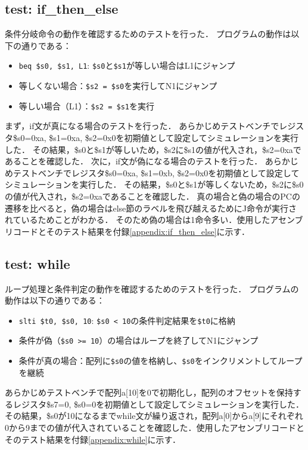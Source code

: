 \documentclass[dvipdfmx]{jsarticle}
\begin{document}
\subsection{test: if\_then\_else}
条件分岐命令の動作を確認するためのテストを行った．
プログラムの動作は以下の通りである：
\begin{itemize}
\item \texttt{beq \$s0, \$s1, L1}: \texttt{\$s0}と\texttt{\$s1}が等しい場合はL1にジャンプ
\item 等しくない場合：\texttt{\$s2 = \$s0}を実行してN1にジャンプ
\item 等しい場合（L1）：\texttt{\$s2 = \$s1}を実行
\end{itemize}
まず，if文が真になる場合のテストを行った．
あらかじめテストベンチでレジスタ\$s0=0xa, \$s1=0xa, \$s2=0x0を初期値として設定してシミュレーションを実行した．
その結果，\$s0と\$s1が等しいため，\$s2に\$s1の値が代入され，\$s2=0xaであることを確認した．
次に，if文が偽になる場合のテストを行った．
あらかじめテストベンチでレジスタ\$s0=0xa, \$s1=0xb, \$s2=0x0を初期値として設定してシミュレーションを実行した．
その結果，\$s0と\$s1が等しくないため，\$s2に\$s0の値が代入され，\$s2=0xaであることを確認した．
真の場合と偽の場合のPCの遷移を比べると，偽の場合はelse節のラベルを飛び越えるためにJ命令が実行されているためことがわかる．
そのため偽の場合は1命令多い．使用したアセンブリコードとそのテスト結果を付録\ref{appendix:if_then_else}に示す．

\subsection{test: while}
ループ処理と条件判定の動作を確認するためのテストを行った．
プログラムの動作は以下の通りである：
\begin{itemize}
\item \texttt{slti \$t0, \$s0, 10}: \texttt{\$s0 < 10}の条件判定結果を\texttt{\$t0}に格納
\item 条件が偽（\texttt{\$s0 >= 10}）の場合はループを終了してN1にジャンプ
\item 条件が真の場合：配列に\texttt{\$s0}の値を格納し、\texttt{\$s0}をインクリメントしてループを継続
\end{itemize}
あらかじめテストベンチで配列a[10]を0で初期化し，配列のオフセットを保持するレジスタ\$s7=0, \$s0=0を初期値として設定してシミュレーションを実行した．
その結果，\$s0が10になるまでwhile文が繰り返され，配列a[0]からa[9]にそれぞれ0から9までの値が代入されていることを確認した．使用したアセンブリコードとそのテスト結果を付録\ref{appendix:while}に示す．
\end{document}

